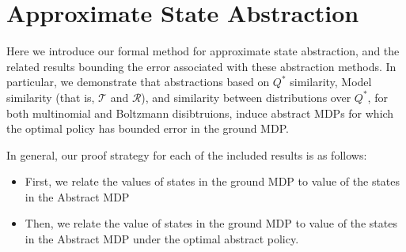 \documentclass{article}
\begin{document}



%


\section{Approximate State Abstraction}

Here we introduce our formal method for approximate state abstraction, and the related results bounding the error associated with these abstraction methods. In particular, we demonstrate that abstractions based on $Q^*$ similarity, Model similarity (that is, $\mathcal{T}$ and $\mathcal{R}$), and similarity between distributions over $Q^*$, for both multinomial and Boltzmann disibtruions, induce abstract MDPs for which the optimal policy has bounded error in the ground MDP.

In general, our proof strategy for each of the included results is as follows:
\begin{itemize}
\item First, we relate the values of states in the ground MDP to value of the states in the Abstract MDP
\item Then, we relate the value of states in the ground MDP to value of the states in the Abstract MDP under the optimal abstract policy.
\end{itemize}
\end{document}
